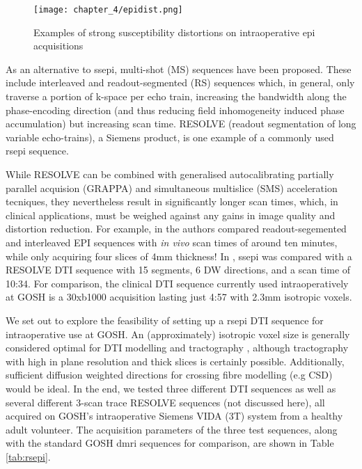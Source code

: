 \begin{figure}[h!]
  \texttt{[image: chapter\_4/epidist.png]}
  \caption{Examples of strong susceptibility distortions on intraoperative \gls{epi} acquisitions}
  \label{fig:epi}
\end{figure}

As an alternative to \gls{ssepi}, multi-shot (MS) sequences have been proposed.
These include interleaved and readout-segmented (RS) sequences which, in general, only traverse a portion of k-space per echo train, increasing the bandwidth along the phase-encoding direction (and thus reducing field inhomogeneity induced phase accumulation) but increasing scan time.\autocite{Wang2018}
RESOLVE (readout segmentation of long variable echo-trains), a Siemens product, is one example of a commonly used \gls{rsepi} sequence.

While RESOLVE can be combined with generalised autocalibrating partially parallel acquision (GRAPPA) and simultaneous multislice (SMS) acceleration tecniques, they nevertheless result in significantly longer scan times, which, in clinical applications, must be weighed against any gains in image quality and distortion reduction.
For example, in \textcite{Wang2018} the authors compared readout-segemented and interleaved EPI sequences with \textit{in vivo} scan times of around ten minutes, while only acquiring four slices of 4mm thickness!
In \textcite{Elliott2020}, \gls{ssepi} was compared with a RESOLVE DTI sequence with 15 segments, 6 DW directions, and a scan time of 10:34.
For comparison, the clinical DTI sequence currently used intraoperatively at GOSH is a 30xb1000 acquisition lasting just 4:57 with 2.3mm isotropic voxels.

We set out to explore the feasibility of setting up a \gls{rsepi} DTI sequence for intraoperative use at GOSH.
An (approximately) isotropic voxel size is generally considered optimal for DTI modelling and tractography \autocite{Vos2011, Neher2013}, although tractography with high in plane resolution and thick slices is certainly possible.
Additionally, sufficient diffusion weighted directions for crossing fibre modelling (e.g CSD) would be ideal.
In the end, we tested three different DTI sequences as well as several different 3-scan trace RESOLVE sequences (not discussed here), all acquired on GOSH’s intraoperative Siemens VIDA (3T) system from a healthy adult volunteer.
The acquisition parameters of the three test sequences, along with the standard GOSH \gls{dmri} sequences for comparison, are shown in Table \ref{tab:rsepi}.

